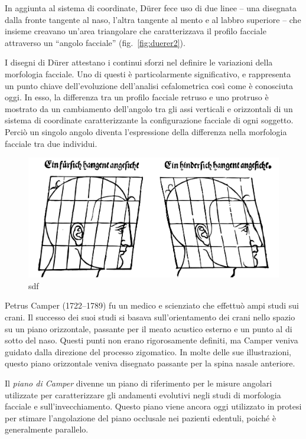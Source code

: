 In aggiunta al sistema di coordinate, Dürer fece uso di due linee -- una disegnata dalla fronte tangente al naso, l'altra tangente al mento e al labbro superiore -- che insieme creavano un'area triangolare che caratterizzava il profilo facciale attraverso un ``angolo facciale'' (fig.~\vref{fig:duerer2}).

I disegni di Dürer attestano i continui sforzi nel definire le variazioni della morfologia facciale. Uno di questi è particolarmente significativo, e rappresenta un punto chiave dell'evoluzione dell'analisi cefalometrica così come è conosciuta oggi. In esso, la differenza tra un profilo facciale retruso e uno protruso è mostrato da un cambiamento dell'angolo tra gli assi verticali e orizzontali di un sistema di coordinate caratterizzante la configurazione facciale di ogni soggetto. Perciò un singolo angolo diventa l'espressione della differenza nella morfologia facciale tra due individui.

\begin{figure}[ht!]
 \centering
 \includegraphics[width=.5\textwidth]{./images/duerer-proportional-3.pdf}
 \caption{sdf}
 \label{fig:duerer3}
\end{figure}

Petrus Camper (1722--1789) fu un medico e scienziato che effettuò ampi studi sui crani. Il successo dei suoi studi si basava sull'orientamento dei crani nello spazio su un piano orizzontale, passante per il meato acustico esterno e un punto al di sotto del naso. Questi punti non erano rigorosamente definiti, ma Camper veniva guidato dalla direzione del processo zigomatico. In molte delle sue illustrazioni, questo piano orizzontale veniva disegnato passante per la spina nasale anteriore.

Il \textit{piano di Camper} divenne un piano di riferimento per le misure angolari utilizzate per caratterizzare gli andamenti evolutivi negli studi di morfologia facciale e sull'invecchiamento. Questo piano viene ancora oggi utilizzato in protesi per stimare l'angolazione del piano occlusale nei pazienti edentuli, poiché è generalmente parallelo.

